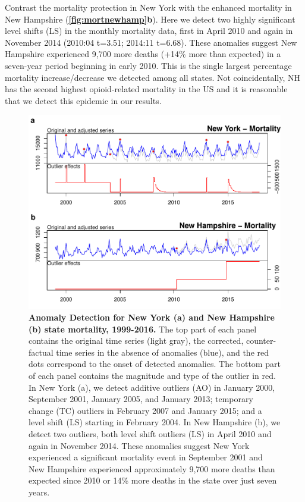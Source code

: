 \documentclass[12pt]{article}
\begin{document}
Contrast the mortality protection in New York with the enhanced
mortality in New Hampshire (\textbf{\autoref{fig:mortnewhamp}b}). Here
we detect two highly significant level shifts (LS) in the monthly
mortality data, first in April 2010 and again in November 2014 (2010:04
t=3.51; 2014:11 t=6.68). These anomalies suggest New Hampshire
experienced 9,700 more deaths (+14\% more than expected) in a seven-year
period beginning in early 2010. This is the single largest percentage
mortality increase/decrease we detected among all states. Not
coincidentally, NH has the second highest opioid-related mortality in
the US \citep{beetham2019access} and it is reasonable that we detect
this epidemic in our results.

\begin{figure}
\centering
\includegraphics{manuscript_files/figure-latex/MortalityAnomalies-1.pdf}
\caption{\textbf{Anomaly Detection for New York (a) and New Hampshire (b) state mortality, 1999-2016.}
The top part of each panel contains the original time series (light
gray), the corrected, counter-factual time series in the absence of
anomalies (blue), and the red dots correspond to the onset of detected
anomalies. The bottom part of each panel contains the magnitude and type
of the outlier in red. In New York (a), we detect additive outliers (AO)
in January 2000, September 2001, January 2005, and January 2013;
temporary change (TC) outliers in February 2007 and January 2015; and a
level shift (LS) starting in February 2004. In New Hampshire (b), we
detect two outliers, both level shift outliers (LS) in April 2010 and
again in November 2014. These anomalies suggest New York experienced a
significant mortality event in September 2001 and New Hampshire
experienced approximately 9,700 more deaths than expected since 2010 or
14\% more deaths in the state over just seven years.
\label{fig:mortnewhamp}}
\end{figure}
\end{document}
